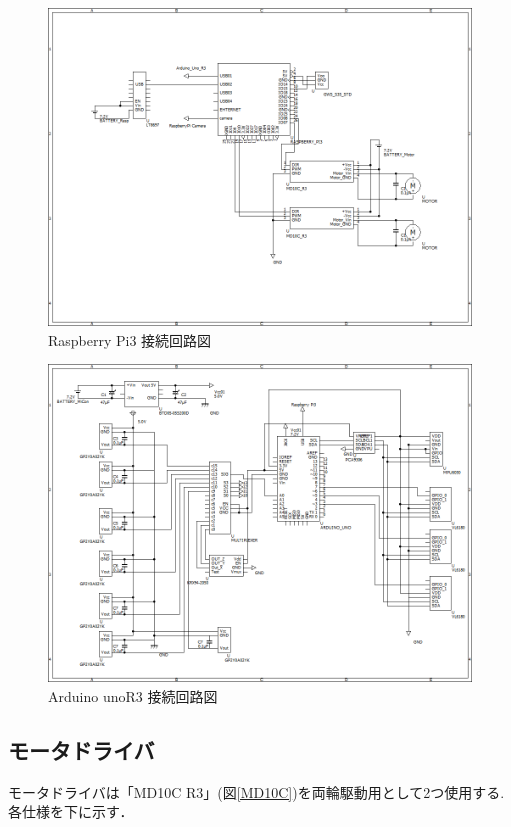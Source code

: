 \documentclass[10pt,a4j]{ujarticle}
\begin{document}
\begin{figure}[h]
 \centering
 \includegraphics[clip,scale=0.38]{./picture/RCR_RaspberryPi3_02.png}
    \caption{Raspberry Pi3 接続回路図}
    \label{c_raspberry}
\end{figure}

\begin{figure}[h]
 \centering
 \includegraphics[clip,scale=0.38]{./picture/RCR_arduino_02.png}
    \caption{Arduino unoR3 接続回路図}
    \label{c_arduino}
\end{figure}
\newpage

\newpage
\subsection{モータドライバ}
モータドライバは「MD10C R3」(図\ref{MD10C})を両輪駆動用として2つ使用する.
各仕様を下に示す．
\end{document}

